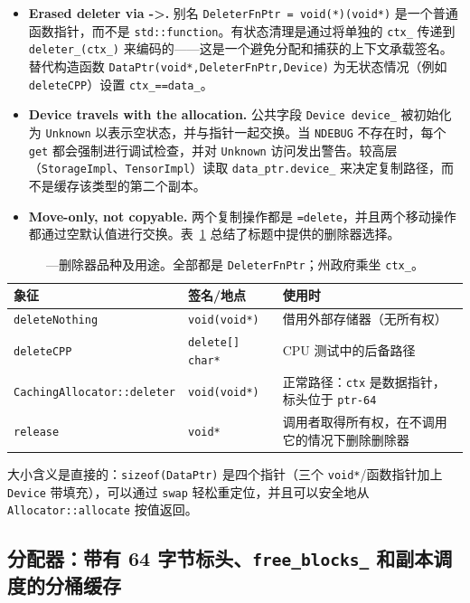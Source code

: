 \begin{itemize}[leftmargin=1.2em]
\item \textbf{Erased deleter via ->.} 别名 \texttt{DeleterFnPtr = void(*)(void*)} 是一个普通函数指针，而不是 \texttt{std::function}。有状态清理是通过将单独的 \texttt{ctx\_} 传递到 \texttt{deleter\_(ctx\_)} 来编码的——这是一个避免分配和捕获的上下文承载签名。替代构造函数 \texttt{DataPtr(void*,DeleterFnPtr,Device)} 为无状态情况（例如 \texttt{deleteCPP}）设置 \texttt{ctx\_==data\_}。
\item \textbf{Device travels with the allocation.} 公共字段 \texttt{Device device\_} 被初始化为 \texttt{Unknown} 以表示空状态，并与指针一起交换。当 \texttt{NDEBUG} 不存在时，每个 \texttt{get} 都会强制进行调试检查，并对 \texttt{Unknown} 访问发出警告。较高层（\texttt{StorageImpl}、\texttt{TensorImpl}）读取 \texttt{data\_ptr.device\_} 来决定复制路径，而不是缓存该类型的第二个副本。
\item \textbf{Move-only, not copyable.} 两个复制操作都是 \texttt{=delete}，并且两个移动操作都通过空默认值进行交换。表~\ref{tab:dataptr} 总结了标题中提供的删除器选择。
\end{itemize}

\begin{table}[H]
\centering
\caption{---删除器品种及用途。全部都是 \texttt{DeleterFnPtr}；州政府乘坐 \texttt{ctx\_}。}
\label{tab:dataptr}
\small
\begin{tabular}{lll}
\toprule
象征 & 签名/地点 & 使用时 \\
\midrule
\texttt{deleteNothing} & \texttt{void(void*)} & 借用外部存储器（无所有权） \\
\texttt{deleteCPP} & \texttt{delete[] char*} & CPU 测试中的后备路径 \\
\texttt{CachingAllocator::deleter} & \texttt{void(void*)} & 正常路径：\texttt{ctx} 是数据指针，标头位于 \texttt{ptr-64} \\
\texttt{release} & \texttt{void*} & 调用者取得所有权，在不调用它的情况下删除删除器 \\
\bottomrule
\end{tabular}
\end{table}

大小含义是直接的：\texttt{sizeof(DataPtr)} 是四个指针（三个 \texttt{void*}/函数指针加上 \texttt{Device} 带填充），可以通过 \texttt{swap} 轻松重定位，并且可以安全地从 \texttt{Allocator::allocate} 按值返回。

\subsection{分配器：带有 64 字节标头、\texttt{free\_blocks\_} 和副本调度的分桶缓存}
\label{sec:allocator}

